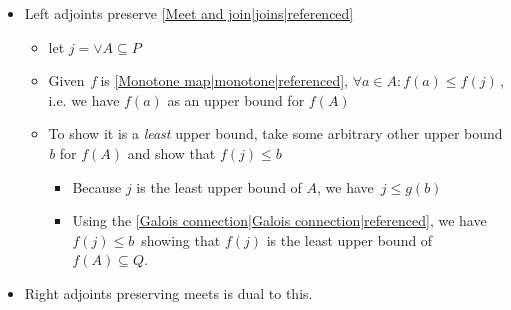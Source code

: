 \begin{itemize}

    \item Left adjoints preserve \ref{Meet and join|joins|referenced}
          \begin{itemize}
            \item let $j = \vee A \subseteq P$
            \item Given \,\emph{f} is \ref{Monotone map|monotone|referenced}, $\forall a \in A: f(a) \leq f(j)$\,, i.e. we have $f(a)$ as an upper bound for $f(A)$
            \item To show it is a \emph{least} upper bound, take some arbitrary other upper bound \emph{b} for $f(A)$ and show that $f(j) \leq b$
                  \begin{itemize}
                    \item Because $j$ is the least upper bound of $A$, we have \,$j \leq g(b)$\,
                    \item Using the \ref{Galois connection|Galois connection|referenced}, we have \,$f(j) \leq b$\, showing that $f(j)$ is the least upper bound of $f(A) \subseteq Q$.
                  \end{itemize}
          \end{itemize}
      \item Right adjoints preserving meets is dual to this.
  \end{itemize}